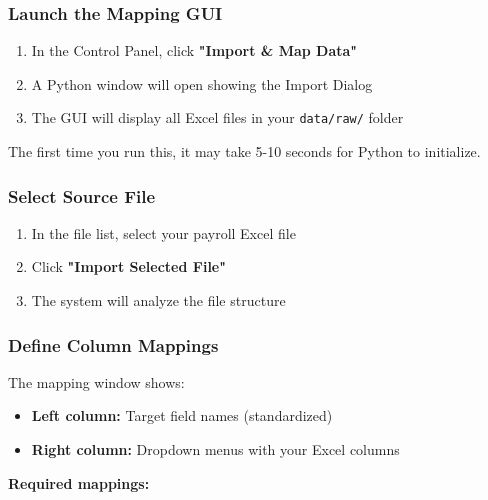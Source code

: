 \documentclass[11pt,a4paper]{article}
\begin{document}
\subsubsection{Launch the Mapping GUI}

\begin{enumerate}[leftmargin=*]
    \item In the Control Panel, click \textbf{"Import \& Map Data"}
    \item A Python window will open showing the Import Dialog
    \item The GUI will display all Excel files in your \texttt{data/raw/} folder
\end{enumerate}

\begin{infobox}[title=First-Time Setup]
The first time you run this, it may take 5-10 seconds for Python to initialize.
\end{infobox}

\subsubsection{Select Source File}

\begin{enumerate}[leftmargin=*]
    \item In the file list, select your payroll Excel file
    \item Click \textbf{"Import Selected File"}
    \item The system will analyze the file structure
\end{enumerate}

\subsubsection{Define Column Mappings}

The mapping window shows:

\begin{itemize}[leftmargin=*]
    \item \textbf{Left column:} Target field names (standardized)
    \item \textbf{Right column:} Dropdown menus with your Excel columns
\end{itemize}

\textbf{Required mappings:}
\end{document}
